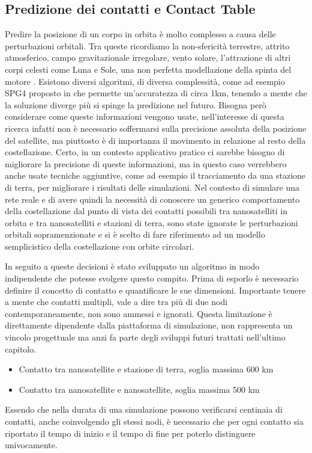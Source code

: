 \documentclass[a4paper]{article}
\begin{document}
		\subsection{Predizione dei contatti e Contact Table}
		Predire la posizione di un corpo in orbita è molto complesso a causa delle perturbazioni orbitali. Tra queste ricordiamo la non-sfericità terrestre, attrito atmosferico, campo gravitazionale irregolare, vento solare, l'attrazione di altri corpi celesti come Luna e Sole, una non perfetta modellazione della spinta del motore \cite{gilmore2009predicting}. Esistono diversi algoritmi, di diversa complessità, come ad esempio SPG4 proposto in \cite{gilmore2009predicting} che permette un'accuratezza di circa 1km, tenendo a mente che la soluzione diverge più si spinge la predizione nel futuro. Bisogna però considerare come queste informazioni vengono usate, nell'interesse di questa ricerca infatti non è necessario soffermarsi sulla precisione assoluta della posizione del satellite, ma piuttosto è di importanza il movimento in relazione al resto della costellazione. Certo, in un contesto applicativo pratico ci sarebbe bisogno di migliorare la precisione di queste informazioni, ma in questo caso verrebbero anche usate tecniche aggiuntive, come ad esempio il tracciamento da una stazione di terra, per migliorare i risultati delle simulazioni. Nel contesto di simulare una rete reale e di avere quindi la necessità di conoscere un generico comportamento della costellazione dal punto di vista dei contatti possibili tra nanosatelliti in orbita e tra nanosatelliti e stazioni di terra, sono state ignorate le perturbazioni orbitali sopramenzionate e si è scelto di fare riferimento ad un modello semplicistico della costellazione con orbite circolari. 
		
		In seguito a queste decisioni è stato sviluppato un algoritmo in modo indipendente che potesse svolgere questo compito. Prima di esporlo è necessario definire il concetto di contatto e quantificare le sue dimensioni. Importante tenere a mente che contatti multipli, vale a dire tra più di due nodi contemporaneamente, non sono ammessi e ignorati. Questa limitazione è direttamente dipendente dalla piattaforma di simulazione, non rappresenta un vincolo progettuale ma anzi fa parte degli sviluppi futuri trattati nell'ultimo capitolo.
		\begin{itemize}
			\item Contatto tra nanosatellite e stazione di terra, soglia massima 600 km
			\item Contatto tra nanosatellite e nanosatellite, soglia massima 500 km			
		\end{itemize}
		Essendo che nella durata di una simulazione possono verificarsi centinaia di contatti, anche coinvolgendo gli stessi nodi, è necessario che per ogni contatto sia riportato il tempo di inizio e il tempo di fine per poterlo distinguere univocamente. 
\end{document}
